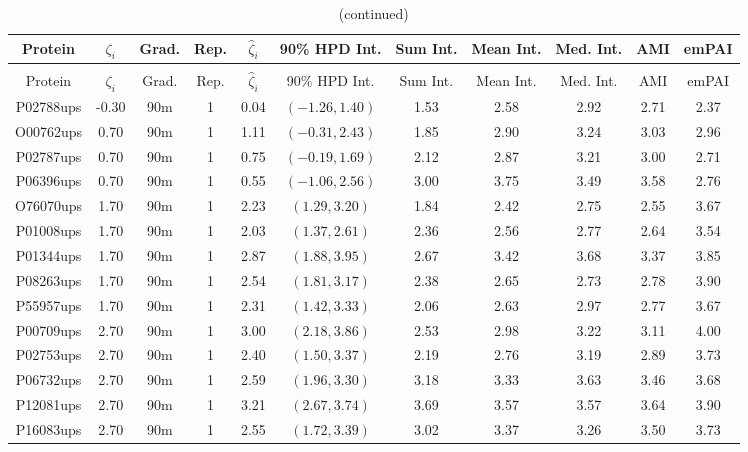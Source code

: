 \begin{landscape}
\begin{longtable}{cccc|cc|ccccc}
\caption{Detailed empirical results for UPS2 experiments, 90m gradients
\label{tab:ups2_90m}} \\
 Protein & $\zeta_i$ & Grad. & Rep. & $\hat{\zeta}_i$ & 90\% HPD Int. & Sum Int. & Mean Int. & Med. Int. & AMI & emPAI \\
\hline
\endfirsthead
\caption{(continued)} \\
 Protein & $\zeta_i$ & Grad. & Rep. & $\hat{\zeta}_i$ & 90\% HPD Int. & Sum Int. & Mean Int. & Med. Int. & AMI & emPAI \\
\hline
\endhead
P02788ups & -0.30 & 90m &   1 & 0.04 & $(-1.26, 1.40)$ & 1.53 & 2.58 & 2.92 & 2.71 & 2.37 \\ 
  O00762ups & 0.70 & 90m &   1 & 1.11 & $(-0.31, 2.43)$ & 1.85 & 2.90 & 3.24 & 3.03 & 2.96 \\ 
  P02787ups & 0.70 & 90m &   1 & 0.75 & $(-0.19, 1.69)$ & 2.12 & 2.87 & 3.21 & 3.00 & 2.71 \\ 
  P06396ups & 0.70 & 90m &   1 & 0.55 & $(-1.06, 2.56)$ & 3.00 & 3.75 & 3.49 & 3.58 & 2.76 \\ 
  O76070ups & 1.70 & 90m &   1 & 2.23 & $(1.29, 3.20)$ & 1.84 & 2.42 & 2.75 & 2.55 & 3.67 \\ 
  P01008ups & 1.70 & 90m &   1 & 2.03 & $(1.37, 2.61)$ & 2.36 & 2.56 & 2.77 & 2.64 & 3.54 \\ 
  P01344ups & 1.70 & 90m &   1 & 2.87 & $(1.88, 3.95)$ & 2.67 & 3.42 & 3.68 & 3.37 & 3.85 \\ 
  P08263ups & 1.70 & 90m &   1 & 2.54 & $(1.81, 3.17)$ & 2.38 & 2.65 & 2.73 & 2.78 & 3.90 \\ 
  P55957ups & 1.70 & 90m &   1 & 2.31 & $(1.42, 3.33)$ & 2.06 & 2.63 & 2.97 & 2.77 & 3.67 \\ 
  P00709ups & 2.70 & 90m &   1 & 3.00 & $(2.18, 3.86)$ & 2.53 & 2.98 & 3.22 & 3.11 & 4.00 \\ 
  P02753ups & 2.70 & 90m &   1 & 2.40 & $(1.50, 3.37)$ & 2.19 & 2.76 & 3.19 & 2.89 & 3.73 \\ 
  P06732ups & 2.70 & 90m &   1 & 2.59 & $(1.96, 3.30)$ & 3.18 & 3.33 & 3.63 & 3.46 & 3.68 \\ 
  P12081ups & 2.70 & 90m &   1 & 3.21 & $(2.67, 3.74)$ & 3.69 & 3.57 & 3.57 & 3.64 & 3.90 \\ 
  P16083ups & 2.70 & 90m &   1 & 2.55 & $(1.72, 3.39)$ & 3.02 & 3.37 & 3.26 & 3.50 & 3.73 \\ 

\end{longtable}
\end{landscape}
